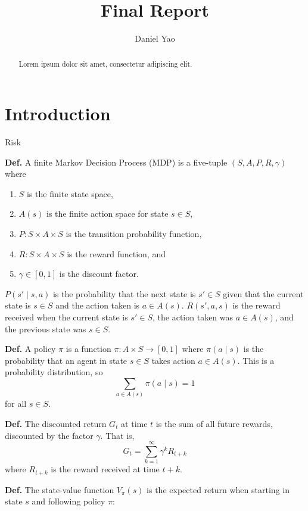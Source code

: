 \documentclass[final,5p,times,twocolumn]{elsarticle}
\begin{document}
\begin{frontmatter}

\title{Final Report}
\author{Daniel Yao}

\begin{abstract}
Lorem ipsum dolor sit amet, consectetur adipiscing elit.
\end{abstract}

\end{frontmatter}

\section{Introduction}
\label{sec:intro}

Risk \cite{KepplerChoi2000Risk}

\textbf{Def.} A finite Markov Decision Process (MDP) is a five-tuple $(S, A, P, R, \gamma)$ where\cite{risk1959}\cite{puterman2014markov}
\begin{enumerate}
    \item $S$ is the finite state space,
    \item $A(s)$ is the finite action space for state $s \in S$,
    \item $P: S \times A \times S$ is the transition probability function,
    \item $R: S \times A \times S$ is the reward function, and 
    \item $\gamma \in [0, 1]$ is the discount factor.
\end{enumerate}
$P(s' \mid s, a)$ is the probability that the next state is $s' \in S$ given that the current state is $s \in S$ and the action taken is $a \in A(s)$. $R(s', a, s)$ is the reward received when the current state is $s' \in S$, the action taken was $a \in A(s)$, and the previous state was $s \in S$.

\textbf{Def.} A policy $\pi$ is a function $\pi: A \times S \to [0, 1]$ where $\pi(a \mid s)$ is the probability that an agent in state $s \in S$ takes action $a \in A(s)$. This is a probability distribution, so 
$$\sum_{a \in A(s)} \pi(a \mid s) = 1$$
for all $s \in S$.

\textbf{Def.} The discounted return $G_{t}$ at time $t$ is the sum of all future rewards, discounted by the factor $\gamma$. That is,
$$G_{t} = \sum_{k=1}^{\infty} \gamma^{k} R_{t+k}$$
where $R_{t+k}$ is the reward received at time $t+k$. 

\textbf{Def.} The state-value function $V_{\pi}(s)$ is the expected return when starting in state $s$ and following policy $\pi$:
\end{document}

